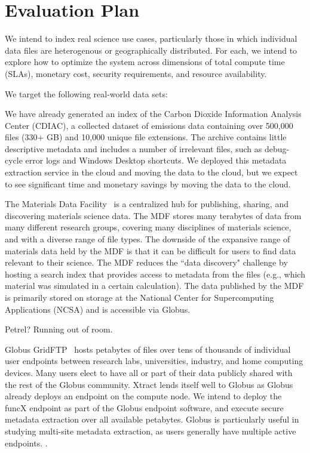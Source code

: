 \documentclass[sigconf]{acmart}
\newcommand{\tyler}[1]{}
\newcommand{\tyler}[1]{{\textcolor{cyan}{ tyler: #1 }}}
\begin{document}
\section{Evaluation Plan}
\label{sec:eval}

We intend to index real science use cases, particularly those in which individual data files are heterogenous 
or geographically distributed. For each, we intend to explore how to optimize the system across dimensions of 
total compute time (SLAs), monetary cost, security requirements, and resource availability.

We target the following real-world data sets: 

We have already generated an index of the Carbon Dioxide Information Analysis Center (CDIAC), a collected dataset of 
emissions data containing over 500,000 files (330+ GB) and 10,000 unique file extensions. The archive contains little 
descriptive metadata and includes a number of irrelevant files, such as debug-cycle error logs and Windows Desktop 
shortcuts.  We deployed this metadata extraction service in the cloud and moving the data to the cloud, but we expect 
to see significant time and monetary savings by moving the data to the cloud.  

The Materials Data Facility~\cite{blaiszik2016materials, blaiszik2019mdf}
is a centralized hub for publishing, sharing, and discovering materials science data. 
The MDF stores many terabytes of data from many different research groups, covering many disciplines of 
materials science, and with a diverse range of file types.
The downside of the expansive range of materials data held by the MDF 
is that it can be difficult for users to find data relevant to their science.
The MDF reduces the ``data discovery" challenge by hosting a search index that provides access to metadata from the 
files (e.g., which material was simulated in a certain calculation).
The data published by the MDF is primarily stored on storage at the National Center for Supercomputing Applications
(NCSA) and is accessible via Globus.  

Petrel? Running out of room. 

Globus GridFTP~\cite{ananthakrishnan2018globus} hosts petabytes of files over tens of thousands of individual user endpoints between research labs, 
universities, industry, and home computing devices. Many \tyler{???} users elect to have all or part of their data publicly 
shared with the rest of the Globus community. Xtract lends itself well to Globus as Globus already deploys an 
endpoint on the compute node.  We intend to deploy the funcX endpoint as part of the Globus endpoint software, and 
execute secure metadata extraction over all available petabytes. Globus is particularly useful in studying multi-site 
metadata extraction, as users generally have multiple active endpoints. \tyler{more detail}. 
\end{document}
